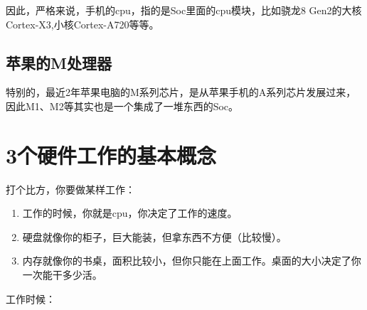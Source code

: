 \documentclass[
  letterpaper,
  DIV=11,
  numbers=noendperiod]{scrreprt}
\providecommand{\tightlist}{%
  \setlength{\itemsep}{0pt}\setlength{\parskip}{0pt}}\usepackage{longtable,booktabs,array}
\begin{document}
因此，严格来说，手机的cpu，指的是Soc里面的cpu模块，比如骁龙8
Gen2的大核Cortex-X3,小核Cortex-A720等等。

\hypertarget{ux82f9ux679cux7684mux5904ux7406ux5668}{%
\subsection*{苹果的M处理器}\label{ux82f9ux679cux7684mux5904ux7406ux5668}}

特别的，最近2年苹果电脑的M系列芯片，是从苹果手机的A系列芯片发展过来，因此M1、M2等其实也是一个集成了一堆东西的Soc。

\hypertarget{ux4e2aux786cux4ef6ux5de5ux4f5cux7684ux57faux672cux6982ux5ff5}{%
\section*{3个硬件工作的基本概念}\label{ux4e2aux786cux4ef6ux5de5ux4f5cux7684ux57faux672cux6982ux5ff5}}


打个比方，你要做某样工作：

\begin{enumerate}
\def\labelenumi{\arabic{enumi}.}
\tightlist
\item
  工作的时候，你就是cpu，你决定了工作的速度。
\item
  硬盘就像你的柜子，巨大能装，但拿东西不方便（比较慢）。
\item
  内存就像你的书桌，面积比较小，但你只能在上面工作。桌面的大小决定了你一次能干多少活。
\end{enumerate}

工作时候：
\end{document}
